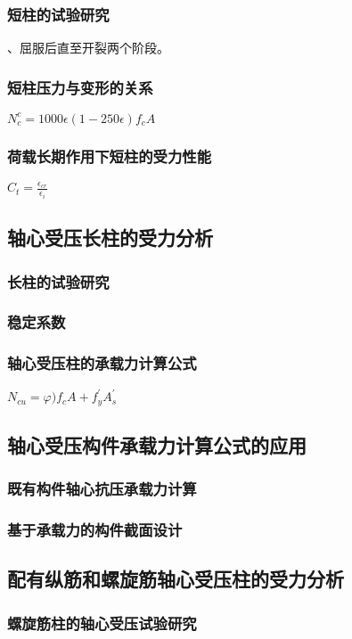 \documentclass{article}
\begin{document}
\subsubsection{短柱的试验研究}
、屈服后直至开裂两个阶段。
\subsubsection{短柱压力与变形的关系}
$N_c^c=1000\epsilon(1-250\epsilon)f_cA$
\subsubsection{荷载长期作用下短柱的受力性能}
$C_t=\frac{\epsilon_{cr}}{\epsilon_i}$
\subsection{轴心受压长柱的受力分析}
\subsubsection{长柱的试验研究}
\subsubsection{稳定系数}
\subsubsection{轴心受压柱的承载力计算公式}
\par$N_{cu}=\varphi)f_cA+f_y^{\prime}A_s^{\prime}$
\subsection{轴心受压构件承载力计算公式的应用}
\subsubsection{既有构件轴心抗压承载力计算}
\subsubsection{基于承载力的构件截面设计}
\subsection{配有纵筋和螺旋筋轴心受压柱的受力分析}
\subsubsection{螺旋筋柱的轴心受压试验研究}
\end{document}
